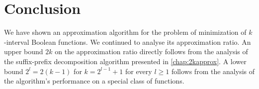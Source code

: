 \section{Conclusion}

We have shown an approximation algorithm for the problem of minimization of $k$-interval Boolean functions.
We continued to analyse its approximation ratio.
An upper bound $2k$ on the approximation ratio
directly follows from the analysis of the suffix-prefix decomposition algorithm presented in \cref{chap:2kapprox}.
A lower bound $2^l = 2(k-1)$
for $k = 2^{l-1}+1$ for every $l \geq 1$
follows from the analysis of the algorithm's performance
on a special class of  functions.

